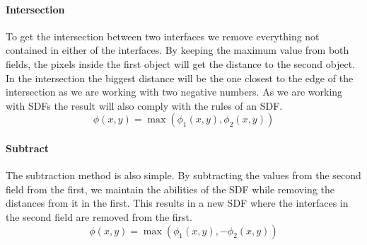 \paragraph{Intersection}
To get the intersection between two interfaces we remove everything
not contained in either of the interfaces. By keeping the maximum
value from both fields, the pixels inside the first object will get
the distance to the second object. In the intersection the biggest
distance will be the one closest to the edge of the intersection as we
are working with two negative numbers. As we are working with SDFs the
result will also comply with the rules of an SDF.
\begin{equation}
\phi(x,y) = \max(\phi_1(x,y),\phi_2(x,y))
\end{equation}

\paragraph{Subtract}
The subtraction method is also simple. By subtracting the values from
the second field from the first, we maintain the abilities of the SDF
while removing the distances from it in the first. This results in a
new SDF where the interfaces in the second field are removed from the
first.
\begin{equation}
\phi(x,y) = \max(\phi_1(x,y),-\phi_2(x,y))
\end{equation}


